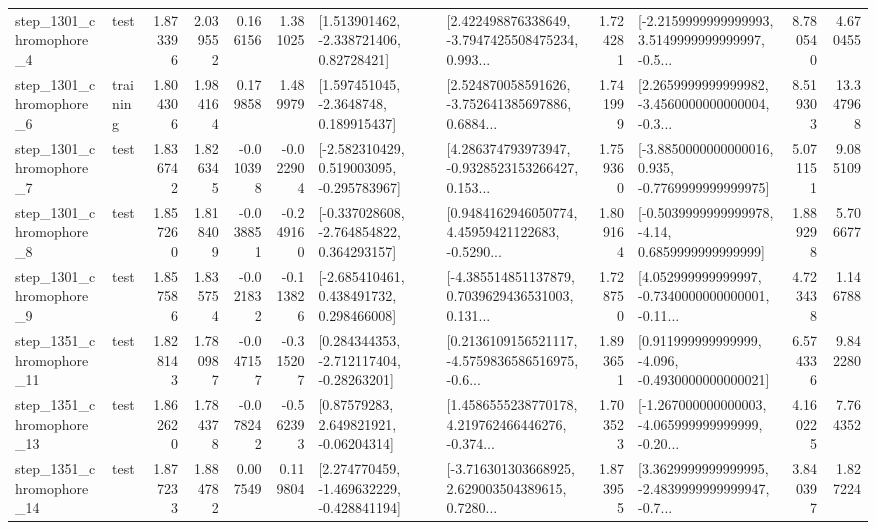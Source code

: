\begin{tabular}{llrrrrllrlrr}
  step\_1301\_chromophore\_4 &      test &      1.873396 &    2.039552 &      0.166156 &  1.381025 &     [1.513901462, -2.338721406, 0.82728421] &  [2.422498876338649, -3.7947425508475234, 0.993... &       1.724281 &  [-2.2159999999999993, 3.5149999999999997, -0.5... &            8.780540 &          4.670455 \\
  step\_1301\_chromophore\_6 &  training &      1.804306 &    1.984164 &      0.179858 &  1.489979 &      [1.597451045, -2.3648748, 0.189915437] &  [2.524870058591626, -3.752641385697886, 0.6884... &       1.741999 &  [2.2659999999999982, -3.4560000000000004, -0.3... &            8.519303 &         13.347968 \\
  step\_1301\_chromophore\_7 &      test &      1.836742 &    1.826345 &     -0.010398 & -0.022904 &   [-2.582310429, 0.519003095, -0.295783967] &  [4.286374793973947, -0.9328523153266427, 0.153... &       1.759360 &  [-3.8850000000000016, 0.935, -0.7769999999999975] &            5.071151 &          9.085109 \\
  step\_1301\_chromophore\_8 &      test &      1.857260 &    1.818409 &     -0.038851 & -0.249160 &   [-0.337028608, -2.764854822, 0.364293157] &  [0.9484162946050774, 4.45959421122683, -0.5290... &       1.809164 &   [-0.5039999999999978, -4.14, 0.6859999999999999] &            1.889298 &          5.706677 \\
  step\_1301\_chromophore\_9 &      test &      1.857586 &    1.835754 &     -0.021832 & -0.113826 &    [-2.685410461, 0.438491732, 0.298466008] &  [-4.385514851137879, 0.7039629436531003, 0.131... &       1.728750 &  [4.052999999999997, -0.7340000000000001, -0.11... &            4.723438 &          1.146788 \\
 step\_1351\_chromophore\_11 &      test &      1.828143 &    1.780987 &     -0.047157 & -0.315207 &    [0.284344353, -2.712117404, -0.28263201] &  [0.2136109156521117, -4.5759836586516975, -0.6... &       1.893651 &   [0.911999999999999, -4.096, -0.4930000000000021] &            6.574336 &          9.842280 \\
 step\_1351\_chromophore\_13 &      test &      1.862620 &    1.784378 &     -0.078242 & -0.562393 &      [0.87579283, 2.649821921, -0.06204314] &  [1.4586555238770178, 4.219762466446276, -0.374... &       1.703523 &  [-1.267000000000003, -4.065999999999999, -0.20... &            4.160225 &          7.764352 \\
 step\_1351\_chromophore\_14 &      test &      1.877233 &    1.884782 &      0.007549 &  0.119804 &   [2.274770459, -1.469632229, -0.428841194] &  [-3.716301303668925, 2.629003504389615, 0.7280... &       1.873955 &  [3.3629999999999995, -2.4839999999999947, -0.7... &            3.840397 &          1.827224 \\

\end{tabular}
